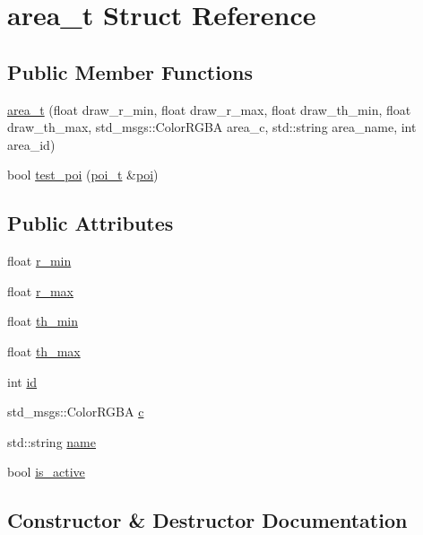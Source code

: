 \hypertarget{structarea__t}{}\section{area\+\_\+t Struct Reference}
\label{structarea__t}
\subsection*{Public Member Functions}
\begin{DoxyCompactItemize}
\item 
\hyperlink{structarea__t_a1b5cd0e73b7c2790f22b647083d823ca}{area\+\_\+t} (float draw\+\_\+r\+\_\+min, float draw\+\_\+r\+\_\+max, float draw\+\_\+th\+\_\+min, float draw\+\_\+th\+\_\+max, std\+\_\+msgs\+::\+Color\+R\+G\+BA area\+\_\+c, std\+::string area\+\_\+name, int area\+\_\+id)
\item 
bool \hyperlink{structarea__t_af678e3be272d68922251bb039de67db2}{test\+\_\+poi} (\hyperlink{structpoi__t}{poi\+\_\+t} \&\hyperlink{gesture__control_8cpp_a1aa23b898528eadf4c747440d5e8a396}{poi})
\end{DoxyCompactItemize}
\subsection*{Public Attributes}
\begin{DoxyCompactItemize}
\item 
float \hyperlink{structarea__t_ab7462395e064eec625efb60399ffd7dd}{r\+\_\+min}
\item 
float \hyperlink{structarea__t_aff46fdf51fe9f94aba74455e4a15426a}{r\+\_\+max}
\item 
float \hyperlink{structarea__t_a930a0c418008eb2f369737fd97c75b3d}{th\+\_\+min}
\item 
float \hyperlink{structarea__t_a0e7df586bb9df7e6d28bf3f9bbe32ca0}{th\+\_\+max}
\item 
int \hyperlink{structarea__t_a5f0ca53f7fab9d65b2726310e98cad63}{id}
\item 
std\+\_\+msgs\+::\+Color\+R\+G\+BA \hyperlink{structarea__t_a2a6b84b8af35f8aa4e77237357a5a54c}{c}
\item 
std\+::string \hyperlink{structarea__t_a2ea22ed89ef6801defea98010f1d3446}{name}
\item 
bool \hyperlink{structarea__t_a5b6ffeb319ff8cdf95717851bedf1204}{is\+\_\+active}
\end{DoxyCompactItemize}


\subsection{Constructor \& Destructor Documentation}
